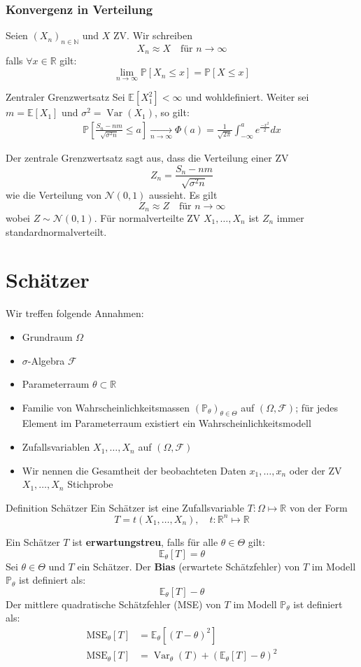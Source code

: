 \documentclass[a4paper,10pt]{article}
\def\R{\mathbb{R}}
\def\P{\mathbb{P}}
\def\F{\mathcal{F}}
\def\E{\mathbb{E}}
\DeclareMathOperator{\Var}{\text{Var}}
\begin{document}
\subsubsection*{Konvergenz in Verteilung}
Seien \((X_n)_{n\in \mathbb{N}}\) und \(X\) ZV. Wir schreiben
\[X_n \approx X \quad \text{für } n \to \infty\]
falls \(\forall x \in \R\) gilt:
\[\lim_{n\to\infty} \P[X_n \le x] = \P[X \le x ]\]

\begin{mainbox}{Zentraler Grenzwertsatz}
    Sei \(\E[X^2_1] < \infty\) und wohldefiniert. Weiter sei \(m = \E[X_1]\) und \(\sigma^2 = \Var(X_1)\), so gilt:
    \begin{align*}
        \P\left[\frac{S_n - nm}{\sqrt{\sigma^2 n}} \leq a\right] \xrightarrow[n \to \infty]{} \Phi(a) = \frac{1}{\sqrt{2 \pi}} \int_{-\infty}^a e^{\frac{-x^2}{2}} dx
    \end{align*}
\end{mainbox}
Der zentrale Grenzwertsatz sagt aus, dass die Verteilung einer ZV
\[Z_n = \frac{S_n - nm}{\sqrt{\sigma^2 n}}\]
wie die Verteilung von \(\mathcal{N}(0,1)\) aussieht. Es gilt
\[Z_n \approx Z \quad \text{für } n\to \infty\]
wobei \(Z \sim \mathcal{N}(0,1)\). Für normalverteilte ZV \(X_1, \ldots, X_n\) ist \(Z_n\) immer standardnormalverteilt.

\section{Schätzer}
Wir treffen folgende Annahmen:
\begin{itemize}
    \item Grundraum \(\Omega\)
    \item \(\sigma\)-Algebra \(\F\)
    \item Parameterraum \(\theta \subset \R\)
    \item Familie von Wahrscheinlichkeitsmassen \((\P_\theta)_{\theta \in \Theta}\) auf \((\Omega, \F)\); für jedes Element im Parameterraum existiert ein Wahrscheinlichkeitsmodell
    \item Zufallsvariablen \(X_1, \ldots, X_n\) auf \((\Omega, \F)\)
    \item Wir nennen die Gesamtheit der beobachteten Daten \(x_1, \ldots, x_n\) oder der ZV \(X_1, \ldots, X_n\) Stichprobe
\end{itemize}
\begin{mainbox}{Definition Schätzer}
    Ein Schätzer ist eine Zufallsvariable \(T: \Omega \mapsto \R\) von der Form
    \[T = t(X_1, \ldots, X_n), \quad t: \R^n \mapsto \R\]
\end{mainbox}
Ein Schätzer \(T\) ist \textbf{erwartungstreu}, falls für alle \(\theta \in \Theta\) gilt:
\[\E_\theta [T] = \theta\]
Sei \(\theta \in \Theta\) und \(T\) ein Schätzer. Der \textbf{Bias} (erwartete Schätzfehler) von \(T\) im Modell \(\P_\theta\) ist definiert als:
\[\E_\theta[T]-\theta\]
Der mittlere quadratische Schätzfehler (MSE) von \(T\) im Modell \(\P_\theta\) ist definiert als:
\begin{align*}
    \text{MSE}_\theta[T] & = \E_\theta[(T-\theta)^2]                    \\
    \text{MSE}_\theta[T] & = \Var_\theta(T) + (\E_\theta[T] - \theta)^2
\end{align*}
\end{document}
